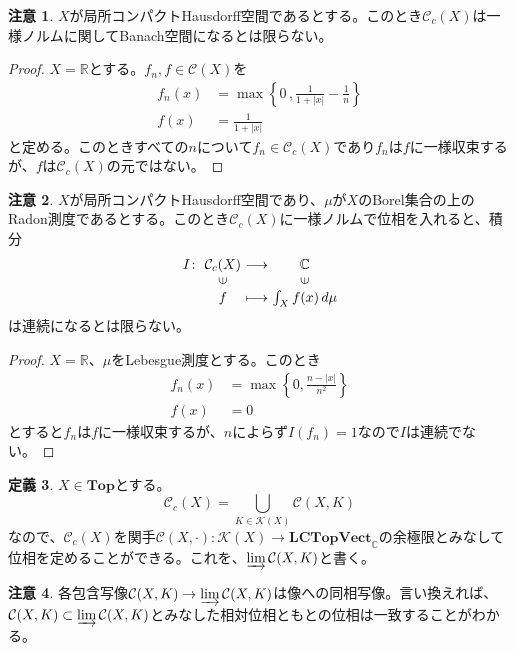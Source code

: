 ﻿\documentclass[12pt]{jsarticle}
\makeatletter
\newcommand{\R}{\mathbb{R}}
\newcommand{\C}{\mathbb{C}}
\newcommand{\Top}{\textbf{Top}}
\newcommand{\LCTopVect}{\textbf{LCTopVect}_{\C}}
\newcommand{\CX}{\mathcal{C}(X)}%
\newcommand{\CCX}{\mathcal{C}_c(X)}%
\newcommand{\CXK}{\mathcal{C}(X,K)}%
\newcommand{\KX}{\mathcal{K}(X)}%
\newcommand{\limCXK}{\varinjlim \CXK}%
\newcommand{\mapdisplay}[5]{\begin{array}{r@{\,\,}c@{\,\,}c@{\,\,}c}#1\colon&#2&\longrightarrow&#3\\ &\rotatebox{90}{$\in$}&&\rotatebox{90}{$\in$}\\ &#4&\longmapsto&#5 \end{array}}%
\newcommand{\abs}[1]{\left \lvert #1 \right \rvert}%
\theoremstyle{definition}%
\newtheorem{definition}{定義}[section]%
\newtheorem{remark}[definition]{注意}
\renewenvironment{leftbar}{%
  \renewcommand\FrameCommand{\vrule width 1pt \hspace{10pt}}%
  \MakeFramed {\advance\hsize-\width \FrameRestore}}
 {\endMakeFramed}
\newenvironment{bardefinition}{ \begin{definition} \begin{leftbar}} {\end{leftbar} \end{definition}}
\makeatother
\begin{document}
\begin{remark}
  $X$が局所コンパクトHausdorff空間であるとする。このとき$\CCX$は一様ノルムに関してBanach空間になるとは限らない。
\end{remark}

\begin{proof}
$X = \R$とする。$f_n, f \in \CX$を
\begin{align*}
  f_n(x) &= \max \left\{ 0 \, , \frac{1}{1+\abs{x}}-\frac{1}{n} \right\} \\
  f(x) &= \frac{1}{1+\abs{x}}
\end{align*}
と定める。このときすべての$n$について$f_n \in \CCX$であり$f_n$は$f$に一様収束するが、$f$は$\CCX$の元ではない。
\end{proof}

\begin{remark}
  $X$が局所コンパクトHausdorff空間であり、$\mu$が$X$のBorel集合の上のRadon測度であるとする。このとき$\CCX$に一様ノルムで位相を入れると、積分
  \[
\mapdisplay{I}{\CCX}{\C}{f}{\int_X f(x) \, d\mu}
  \]
は連続になるとは限らない。
\end{remark}
\begin{proof}
  $X = \R$、$\mu$をLebesgue測度とする。このとき
  \begin{align*}
    f_n(x) &= \max \left\{ 0,  \frac{n - \abs{x}}{n^2}   \right\} \\
    f(x) &= 0
  \end{align*}
とすると$f_n$は$f$に一様収束するが、$n$によらず$I(f_n)=1$なので$I$は連続でない。
\end{proof}


\begin{bardefinition}
  $X \in \Top$とする。
  \[
  \CCX = \bigcup_{K \in \KX} \CXK
  \]
  なので、$\CCX$を関手$\mathcal{C}(X,\cdot) \colon \KX \to \LCTopVect$の余極限とみなして位相を定めることができる。これを、$\varinjlim \CXK$と書く。
\end{bardefinition}

\begin{remark}
  各包含写像$\CXK \to \limCXK$は像への同相写像。言い換えれば、$\CXK \subset \limCXK$とみなした相対位相ともとの位相は一致することがわかる。
\end{remark}
\end{document}
